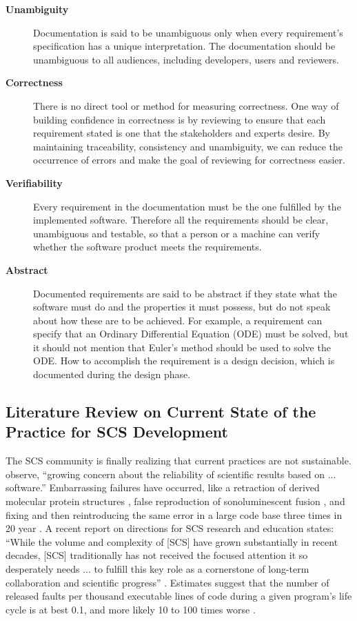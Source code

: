 \documentclass[12pt]{article}
\begin{document}
\begin{description}
\item [\textbf{Unambiguity}] Documentation is said to be unambiguous only when
  every requirement's specification has a unique interpretation.  The
  documentation should be unambiguous to all audiences, including developers,
  users and reviewers.

\item [\textbf{Correctness}] There is no direct tool or method for measuring
  correctness. One way of building confidence in correctness is by reviewing to
  ensure that each requirement stated is one that the stakeholders and experts
  desire.  By maintaining traceability, consistency and unambiguity, we can
  reduce the occurrence of errors and make the goal of reviewing for correctness
  easier.

\item [\textbf{Verifiability}] Every requirement in the documentation must be the
  one fulfilled by the implemented software. Therefore all the requirements
  should be clear, unambiguous and testable, so that a person or a machine can
  verify whether the software product meets the requirements.

\item [\textbf{Abstract}] Documented requirements are said to be abstract if they
  state what the software must do and the properties it must possess, but do not
  speak about how these are to be achieved. For example, a requirement can
  specify that an Ordinary Differential Equation (ODE) must be solved, but it
  should not mention that Euler's method should be used to solve the ODE. How to
  accomplish the requirement is a design decision, which is documented during
  the design phase.

\end{description}

\subsection{Literature Review on Current State of the Practice for SCS
  Development} \label{SecCurrStateOfThePractice}

The SCS community is finally realizing that current practices are not
sustainable.  \citet{FaulkEtAl2009} observe, ``growing concern about the
reliability of scientific results based on ... software.''  Embarrassing
failures have occurred, like a retraction of derived molecular protein
structures \citep{Miller2006}, false reproduction of sonoluminescent fusion
\citep{PostAndVotta2005}, and fixing and then reintroducing the same error in a
large code base three times in 20 year \citep{MilewiczAndRaybourn2018}.  A
recent report on directions for SCS research and education states: ``While the
volume and complexity of [SCS] have grown substantially in recent decades, [SCS]
traditionally has not received the focused attention it so desperately needs
... to fulfill this key role as a cornerstone of long-term collaboration and
scientific progress'' \citep{RudeEtAl2018}.  Estimates suggest that the number
of released faults per thousand executable lines of code during a given
program’s life cycle is at best 0.1, and more likely 10 to 100 times worse
\citep{Hatton2007}.
\end{document}

